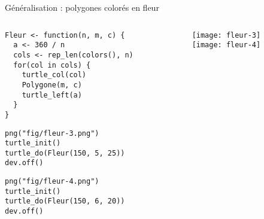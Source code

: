 \documentclass[10pt]{beamer}
\begin{document}
\begin{frame}[fragile]{Généralisation : polygones colorés en fleur}

\begin{columns}[c]
\begin{column}{0.58\textwidth}
  \begin{lstlisting}[style=editor]
Fleur <- function(n, m, c) {
  a <- 360 / n
  cols <- rep_len(colors(), n)
  for(col in cols) {
    turtle_col(col)
    Polygone(m, c)
    turtle_left(a)
  }
}
\end{lstlisting}

\begin{lstlisting}[linerange=2-3]
png("fig/fleur-3.png")
turtle_init()
turtle_do(Fleur(150, 5, 25))
dev.off()
\end{lstlisting}


\begin{lstlisting}[linerange=2-3]
png("fig/fleur-4.png")
turtle_init()
turtle_do(Fleur(150, 6, 20))
dev.off()
\end{lstlisting}

\end{column}

\begin{column}{0.38\textwidth}
  \texttt{[image: fleur-3]}
  \\
  \texttt{[image: fleur-4]}
\end{column}
\end{columns}


\end{frame}



\questionSlide

 \appendix
 \backupSlides







\end{document}

